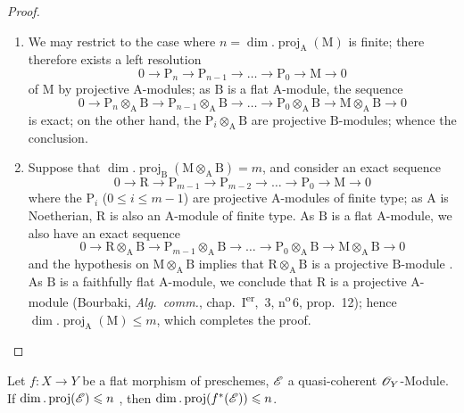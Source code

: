 \begin{proof}
\medskip\noindent
\begin{enumerate}[label=(\roman*)]
  \item We may restrict to the case where $n=\dim.\operatorname{proj}_\mathrm{A}(\mathrm{M})$ is finite; there therefore exists a left resolution
\[
  0\to\mathrm{P}_n\to\mathrm{P}_{n-1}\to\ldots\to\mathrm{P}_0\to\mathrm{M}\to 0
\]
of $\mathrm{M}$ by projective $\mathrm{A}$-modules; as $\mathrm{B}$ is a flat $\mathrm{A}$-module, the sequence
\[
  0\to\mathrm{P}_n\otimes_\mathrm{A}\mathrm{B}\to\mathrm{P}_{n-1}\otimes_\mathrm{A}\mathrm{B}\to\ldots\to\mathrm{P}_0\otimes_\mathrm{A}\mathrm{B}\to\mathrm{M}\otimes_\mathrm{A}\mathrm{B}\to 0
\]
is exact; on the other hand, the $\mathrm{P}_i\otimes_\mathrm{A}\mathrm{B}$ are projective $\mathrm{B}$-modules; whence the conclusion.

  \item Suppose that $\dim.\operatorname{proj}_\mathrm{B}(\mathrm{M}\otimes_\mathrm{A}\mathrm{B})=m$, and consider an exact sequence
\[
  0\to\mathrm{R}\to\mathrm{P}_{m-1}\to\mathrm{P}_{m-2}\to\ldots\to\mathrm{P}_0\to\mathrm{M}\to 0
\]
where the $\mathrm{P}_i$ ($0\leqslant i\leqslant m-1$) are projective $\mathrm{A}$-modules of finite type; as $\mathrm{A}$ is Noetherian, $\mathrm{R}$ is also an $\mathrm{A}$-module of finite type.
As $\mathrm{B}$ is a flat $\mathrm{A}$-module, we also have an exact sequence
\[
  0\to\mathrm{R}\otimes_\mathrm{A}\mathrm{B}\to\mathrm{P}_{m-1}\otimes_\mathrm{A}\mathrm{B}\to\ldots\to\mathrm{P}_0\otimes_\mathrm{A}\mathrm{B}\to\mathrm{M}\otimes_\mathrm{A}\mathrm{B}\to 0
\]
and the hypothesis on $\mathrm{M}\otimes_\mathrm{A}\mathrm{B}$ implies that $\mathrm{R}\otimes_\mathrm{A}\mathrm{B}$ is a projective $\mathrm{B}$-module .
As $\mathrm{B}$ is a faithfully flat $\mathrm{A}$-module, we conclude that $\mathrm{R}$ is a projective $\mathrm{A}$-module (Bourbaki, \emph{Alg.\ comm.}, chap.~I\textsuperscript{er}, \textsection\,3, n\textsuperscript{o}\,6, prop.~12); hence $\dim.\operatorname{proj}_\mathrm{A}(\mathrm{M})\leqslant m$, which completes the proof.
\end{enumerate}
\end{proof}

\begin{corollary}[6.2.2]
\label{IV.6.2.2}
Let $f:X\to Y$ be a flat morphism of preschemes, $\mathscr{E}$ a quasi-coherent $\mathscr{O}_Y$-Module.
If $\dim.\operatorname{proj}(\mathscr{E})\leqslant n$ , then $\dim.\operatorname{proj}(f^*(\mathscr{E}))\leqslant n$.
\end{corollary}

